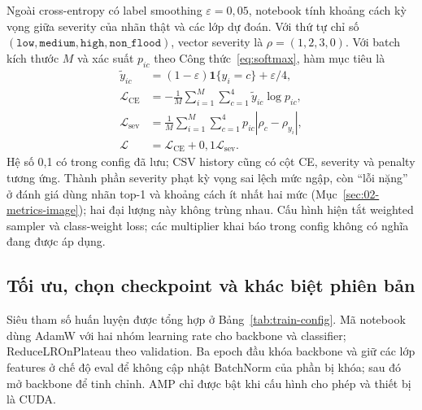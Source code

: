 Ngoài cross-entropy có label smoothing $\varepsilon=0{,}05$, notebook tính khoảng cách kỳ vọng giữa severity của nhãn thật và các lớp dự đoán. Với thứ tự chỉ số $(\texttt{low},\texttt{medium},\texttt{high},\texttt{non\_flood})$, vector severity là $\rho=(1,2,3,0)$. Với batch kích thước $M$ và xác suất $p_{ic}$ theo Công thức~\ref{eq:softmax}, hàm mục tiêu là
\begin{align}
\widetilde y_{ic}&=(1-\varepsilon)\mathbf{1}\{y_i=c\}+\varepsilon/4,\\
\mathcal L_{\mathrm{CE}}&=-\frac{1}{M}\sum_{i=1}^{M}\sum_{c=1}^{4}\widetilde y_{ic}\log p_{ic},\\
\mathcal L_{\mathrm{sev}}&=\frac{1}{M}\sum_{i=1}^{M}\sum_{c=1}^{4}p_{ic}|\rho_c-\rho_{y_i}|,\\
\mathcal L&=\mathcal L_{\mathrm{CE}}+0{,}1\mathcal L_{\mathrm{sev}}.\label{eq:training-loss}
\end{align}
Hệ số 0,1 có trong config đã lưu; CSV history cũng có cột CE, severity và penalty tương ứng. Thành phần severity phạt kỳ vọng sai lệch mức ngập, còn ``lỗi nặng'' ở đánh giá dùng nhãn top-1 và khoảng cách ít nhất hai mức (Mục~\ref{sec:02-metrics-image}); hai đại lượng này không trùng nhau. Cấu hình hiện tắt weighted sampler và class-weight loss; các multiplier khai báo trong config không có nghĩa đang được áp dụng.

\subsection{Tối ưu, chọn checkpoint và khác biệt phiên bản}
Siêu tham số huấn luyện được tổng hợp ở Bảng~\ref{tab:train-config}. Mã notebook dùng AdamW với hai nhóm learning rate cho backbone và classifier; ReduceLROnPlateau theo validation. Ba epoch đầu khóa backbone và giữ các lớp features ở chế độ eval để không cập nhật BatchNorm của phần bị khóa; sau đó mở backbone để tinh chỉnh. AMP chỉ được bật khi cấu hình cho phép và thiết bị là CUDA.

